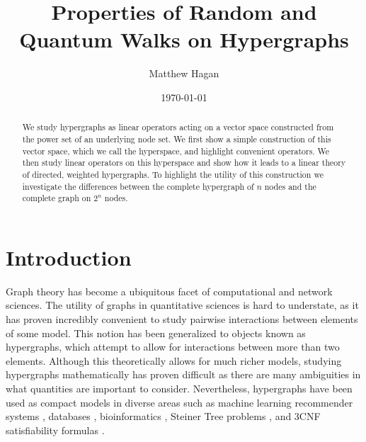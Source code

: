 \documentclass{article}
\title{Properties of Random and Quantum Walks on Hypergraphs}
\author{Matthew Hagan}
\date{\today}
\begin{document}
\maketitle
\begin{abstract}
	We study hypergraphs as linear operators acting on a vector space constructed from the power set of an underlying node set. We first show a simple construction of this vector space, which we call the hyperspace, and highlight convenient operators. We then study linear operators on this hyperspace and show how it leads to a linear theory of directed, weighted hypergraphs. To highlight the utility of this construction we investigate the differences between the complete hypergraph of $n$ nodes and the complete graph on $2^n$ nodes.
\end{abstract}

\section{Introduction}
Graph theory has become a ubiquitous facet of computational and network sciences. The utility of graphs in quantitative sciences is hard to understate, as it has proven incredibly convenient to study pairwise interactions between elements of some model. This notion has been generalized to objects known as hypergraphs, which attempt to allow for interactions between more than two elements. Although this theoretically allows for much richer models, studying hypergraphs mathematically has proven difficult as there are many ambiguities in what quantities are important to consider. Nevertheless, hypergraphs have been used as compact models in diverse areas such as machine learning recommender systems \cite{hgRecSystems}, databases \cite{databases}, bioinformatics \cite{bioinformatics}, Steiner Tree problems \cite{Brazil2015}, and 3CNF satisfiability formulas \cite{3cnf}.
\end{document}
